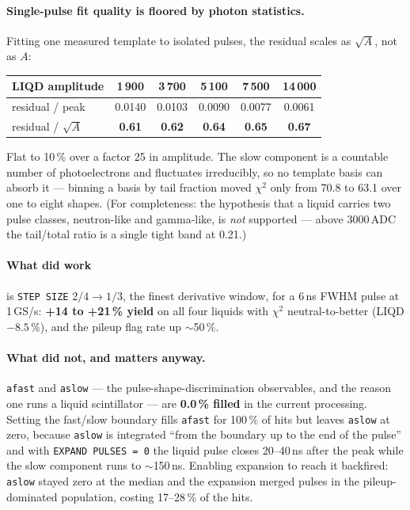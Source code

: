\documentclass[11pt,a4paper]{article}
\begin{document}
\paragraph{Single-pulse fit quality is floored by photon statistics.} Fitting
one measured template to isolated pulses, the residual scales as
$\sqrt{A}$, not as $A$:

\begin{center}\small
\begin{tabular}{lccccc}
\toprule
LIQD amplitude & 1\,900 & 3\,700 & 5\,100 & 7\,500 & 14\,000 \\
\midrule
residual / peak & 0.0140 & 0.0103 & 0.0090 & 0.0077 & 0.0061 \\
residual / $\sqrt{A}$ & \textbf{0.61} & \textbf{0.62} & \textbf{0.64} & \textbf{0.65} & \textbf{0.67} \\
\bottomrule
\end{tabular}
\end{center}

Flat to 10\,\% over a factor 25 in amplitude. The slow component is a countable
number of photoelectrons and fluctuates irreducibly, so no template basis can
absorb it --- binning a basis by tail fraction moved $\chi^2$ only from 70.8 to
63.1 over one to eight shapes. (For completeness: the hypothesis that a liquid
carries two pulse classes, neutron-like and gamma-like, is \emph{not} supported
--- above 3000\,ADC the tail/total ratio is a single tight band at 0.21.)

\paragraph{What did work} is \texttt{STEP SIZE} $2/4 \rightarrow 1/3$, the
finest derivative window, for a 6\,ns FWHM pulse at 1\,GS/s: \textbf{+14 to
+21\,\% yield} on all four liquids with $\chi^2$ neutral-to-better (LIQD
$-8.5$\,\%), and the pileup flag rate up $\sim$50\,\%.

\paragraph{What did not, and matters anyway.} \texttt{afast} and \texttt{aslow}
--- the pulse-shape-discrimination observables, and the reason one runs a liquid
scintillator --- are \textbf{0.0\,\% filled} in the current processing. Setting
the fast/slow boundary fills \texttt{afast} for 100\,\% of hits but leaves
\texttt{aslow} at zero, because \texttt{aslow} is integrated ``from the boundary
up to the end of the pulse'' and with \texttt{EXPAND PULSES = 0} the liquid
pulse closes 20--40\,ns after the peak while the slow component runs to
$\sim$150\,ns. Enabling expansion to reach it backfired: \texttt{aslow} stayed
zero at the median and the expansion merged pulses in the pileup-dominated
population, costing 17--28\,\% of the hits.
\end{document}
